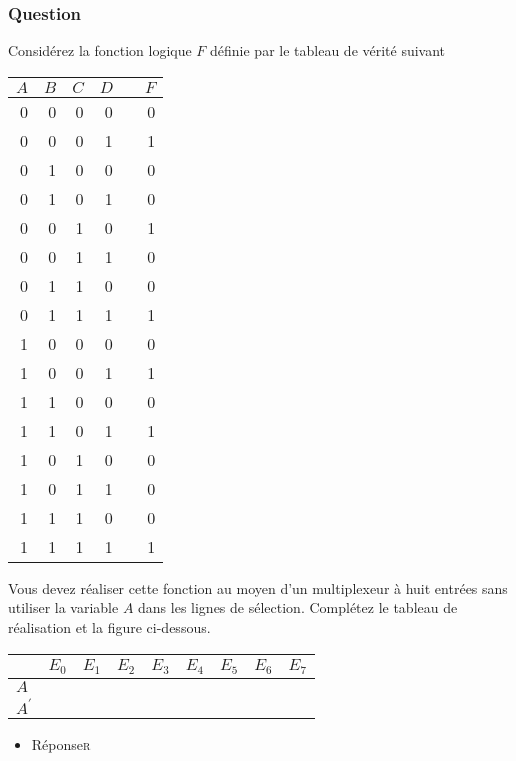 \documentclass[11pt]{article}
\begin{document}
\subsubsection*{Question}
\label{sec:org5dd88f6}
Considérez la fonction logique \(F\) définie par le tableau de vérité suivant
\begin{center}
\begin{tabular}{rrrrlr}
\(A\) & \(B\) & \(C\) & \(D\) &  & \(F\)\\
\hline
0 & 0 & 0 & 0 &  & 0\\
0 & 0 & 0 & 1 &  & 1\\
0 & 1 & 0 & 0 &  & 0\\
0 & 1 & 0 & 1 &  & 0\\
0 & 0 & 1 & 0 &  & 1\\
0 & 0 & 1 & 1 &  & 0\\
0 & 1 & 1 & 0 &  & 0\\
0 & 1 & 1 & 1 &  & 1\\
1 & 0 & 0 & 0 &  & 0\\
1 & 0 & 0 & 1 &  & 1\\
1 & 1 & 0 & 0 &  & 0\\
1 & 1 & 0 & 1 &  & 1\\
1 & 0 & 1 & 0 &  & 0\\
1 & 0 & 1 & 1 &  & 0\\
1 & 1 & 1 & 0 &  & 0\\
1 & 1 & 1 & 1 &  & 1\\
\end{tabular}
\end{center}
Vous devez réaliser cette fonction au moyen d'un multiplexeur à huit
entrées sans utiliser la variable \(A\) dans les lignes de
sélection. Complétez le tableau de réalisation et la figure
ci-dessous.
\begin{center}
\begin{tabular}{lllllllll}
 & \(E_0\) & \(E_1\) & \(E_2\) & \(E_3\) & \(E_4\) & \(E_5\) & \(E_6\) & \(E_7\)\\
\hline
\(A\) &  &  &  &  &  &  &  & \\
\(A^\prime\) &  &  &  &  &  &  &  & \\
\end{tabular}
\end{center}
\begin{center}

\end{center}

\begin{itemize}
\item Réponse\hfill{}\textsc{r}
\label{sec:orga281f72}
\end{itemize}
\end{document}
